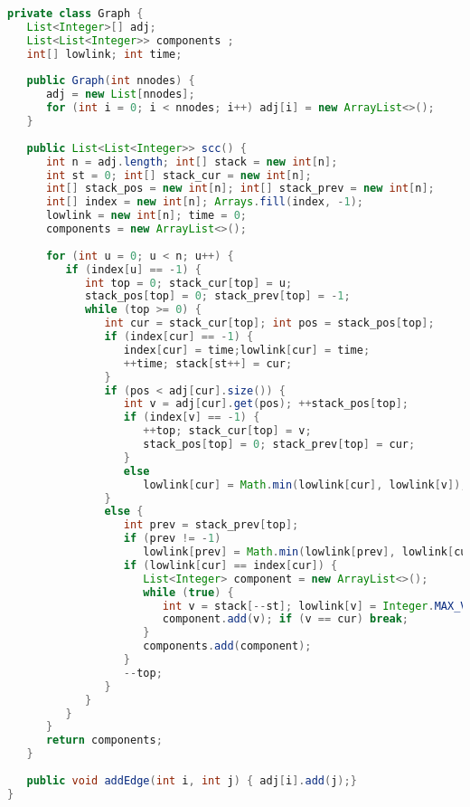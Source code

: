 \begin{lstlisting}[language=Java]
private class Graph {
   List<Integer>[] adj;
   List<List<Integer>> components ;
   int[] lowlink; int time;
	
   public Graph(int nnodes) {
      adj = new List[nnodes];
      for (int i = 0; i < nnodes; i++) adj[i] = new ArrayList<>();
   }
	
   public List<List<Integer>> scc() {
      int n = adj.length; int[] stack = new int[n];
      int st = 0; int[] stack_cur = new int[n];
      int[] stack_pos = new int[n]; int[] stack_prev = new int[n];
      int[] index = new int[n]; Arrays.fill(index, -1);
      lowlink = new int[n]; time = 0;
      components = new ArrayList<>();
		
      for (int u = 0; u < n; u++) {
         if (index[u] == -1) {
            int top = 0; stack_cur[top] = u;
            stack_pos[top] = 0; stack_prev[top] = -1;
            while (top >= 0) {
               int cur = stack_cur[top]; int pos = stack_pos[top];
               if (index[cur] == -1) {
                  index[cur] = time;lowlink[cur] = time;
                  ++time; stack[st++] = cur;
               }
               if (pos < adj[cur].size()) {
                  int v = adj[cur].get(pos); ++stack_pos[top];
                  if (index[v] == -1) {
                     ++top; stack_cur[top] = v;
                     stack_pos[top] = 0; stack_prev[top] = cur;
                  } 
                  else 
                     lowlink[cur] = Math.min(lowlink[cur], lowlink[v]);
               } 
               else {
                  int prev = stack_prev[top];
                  if (prev != -1) 
                     lowlink[prev] = Math.min(lowlink[prev], lowlink[cur]);
                  if (lowlink[cur] == index[cur]) {
                     List<Integer> component = new ArrayList<>();
                     while (true) {
                        int v = stack[--st]; lowlink[v] = Integer.MAX_VALUE;
                        component.add(v); if (v == cur) break;
                     }
                     components.add(component);
                  }
                  --top;
               }
            }
         }
      }
	  return components;
   }
	
   public void addEdge(int i, int j) { adj[i].add(j);}
}
\end{lstlisting}